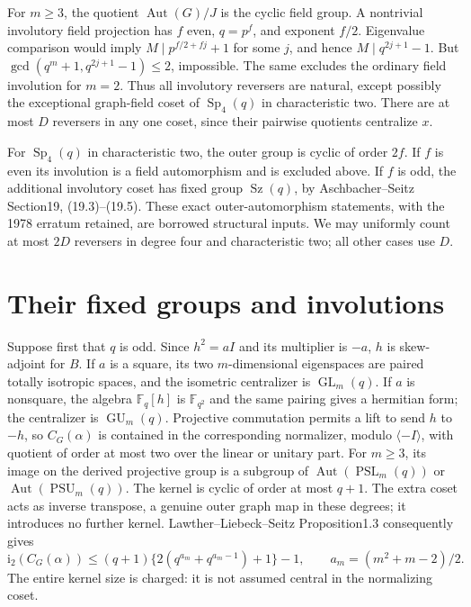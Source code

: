 \documentclass[10pt]{article}
\newcommand{\ii}{\mathrm i_2}\newcommand{\nuu}{\nu_2}\newcommand{\F}{\mathbb F}\newcommand{\GL}{\operatorname{GL}}\newcommand{\GU}{\operatorname{GU}}\newcommand{\Sp}{\operatorname{Sp}}\newcommand{\PSp}{\operatorname{PSp}}\newcommand{\PGSp}{\operatorname{PGSp}}\newcommand{\Aut}{\operatorname{Aut}}
\begin{document}
For $m\ge3$, the quotient $\Aut(G)/J$ is the cyclic field group. A
nontrivial involutory field projection has $f$ even, $q=p^f$, and exponent
$f/2$. Eigenvalue comparison would imply
$M\mid p^{f/2+fj}+1$ for some $j$, and hence $M\mid q^{2j+1}-1$.
But $\gcd(q^m+1,q^{2j+1}-1)\le2$, impossible. The same excludes the
ordinary field involution for $m=2$. Thus all involutory reversers are
natural, except possibly the exceptional graph-field coset of $\Sp_4(q)$
in characteristic two. There are at most $D$ reversers in any one coset,
since their pairwise quotients centralize $x$.

For $\Sp_4(q)$ in characteristic two, the outer group is cyclic of order
$2f$. If $f$ is even its involution is a field automorphism and is excluded
above. If $f$ is odd, the additional involutory coset has fixed group
$\operatorname{Sz}(q)$, by Aschbacher--Seitz Section19, (19.3)--(19.5).
These exact outer-automorphism statements, with the 1978 erratum retained,
are borrowed structural inputs. We may uniformly count at most $2D$
reversers in degree four and characteristic two; all other cases use $D$.

\section{Their fixed groups and involutions}
Suppose first that $q$ is odd. Since $h^2=aI$ and its multiplier is $-a$,
$h$ is skew-adjoint for $B$. If $a$ is a square, its two $m$-dimensional
eigenspaces are paired totally isotropic spaces, and the isometric
centralizer is $\GL_m(q)$. If $a$ is nonsquare, the algebra $\F_q[h]$ is
$\F_{q^2}$ and the same pairing gives a hermitian form; the centralizer is
$\GU_m(q)$. Projective commutation permits a lift to send $h$ to $-h$,
so $C_G(\alpha)$ is contained in the corresponding normalizer, modulo
$\langle-I\rangle$, with quotient of order at most two over the linear or
unitary part. For $m\ge3$, its image on the derived projective group is a
subgroup of $\Aut(\operatorname{PSL}_m(q))$ or
$\Aut(\operatorname{PSU}_m(q))$. The kernel is cyclic of order at most
$q+1$. The extra coset acts as inverse transpose, a genuine outer graph
map in these degrees; it introduces no further kernel.
Lawther--Liebeck--Seitz Proposition1.3 consequently gives
\begin{equation}\label{oddmu}
 \ii(C_G(\alpha))\le (q+1)\{2(q^{a_m}+q^{a_m-1})+1\}-1,
 \qquad a_m=(m^2+m-2)/2.
\end{equation}
The entire kernel size is charged: it is not assumed central in the
normalizing coset.
\end{document}
